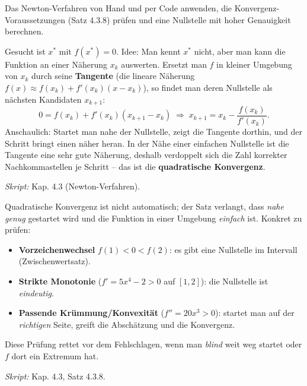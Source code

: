 

Das Newton-Verfahren von Hand und per Code anwenden, die
Konvergenz-Voraussetzungen (Satz 4.3.8) prüfen und eine Nullstelle mit
hoher Genauigkeit berechnen.

\begin{werkzeugkasten}
Gesucht ist $x^*$ mit $f(x^*)=0$. Idee: Man kennt $x^*$ nicht, aber man
kann die Funktion an einer Näherung $x_k$ auswerten. Ersetzt man $f$ in
kleiner Umgebung von $x_k$ durch seine \textbf{Tangente} (die lineare
Näherung $f(x)\approx f(x_k)+f'(x_k)(x-x_k)$), so findet man deren
Nullstelle als nächsten Kandidaten $x_{k+1}$:
\begin{equation*}
  0=f(x_k)+f'(x_k)(x_{k+1}-x_k)
  \;\Longrightarrow\;
  x_{k+1}=x_k-\frac{f(x_k)}{f'(x_k)}.
\end{equation*}
Anschaulich: Startet man nahe der Nullstelle, zeigt die Tangente dorthin,
und der Schritt bringt einen näher heran. In der Nähe einer einfachen
Nullstelle ist die Tangente eine sehr gute Näherung, deshalb verdoppelt
sich die Zahl korrekter Nachkommastellen je Schritt -- das ist die
\textbf{quadratische Konvergenz}.

\textit{Skript:} Kap. 4.3 (Newton-Verfahren).
\end{werkzeugkasten}

\begin{werkzeugkasten}
Quadratische Konvergenz ist nicht automatisch; der Satz verlangt, dass
\emph{nahe genug} gestartet wird und die Funktion in einer Umgebung
\emph{einfach} ist. Konkret zu prüfen:
\begin{itemize}
  \item \textbf{Vorzeichenwechsel} $f(1)<0<f(2)$: es gibt eine Nullstelle
        im Intervall (Zwischenwertsatz).
  \item \textbf{Strikte Monotonie} ($f'=5x^4-2>0$ auf $[1,2]$): die
        Nullstelle ist \emph{eindeutig}.
  \item \textbf{Passende Krümmung/Konvexität} ($f''=20x^3>0$): startet man
        auf der \emph{richtigen} Seite, greift die Abschätzung und die
        Konvergenz.
\end{itemize}
Diese Prüfung rettet vor dem Fehlschlagen, wenn man \emph{blind} weit weg
startet oder $f$ dort ein Extremum hat.

\textit{Skript:} Kap. 4.3, Satz 4.3.8.
\end{werkzeugkasten}


